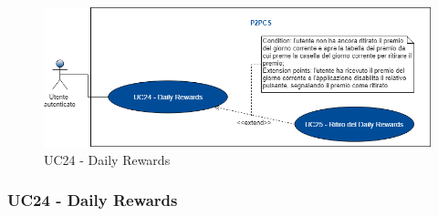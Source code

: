 \begin{figure}[h]
	\includegraphics[width=13.2cm]{res/images/UC24Daily.png}
	\centering
	\caption{UC24 - Daily Rewards}
\end{figure}
\subsubsection{UC24 - Daily Rewards}
